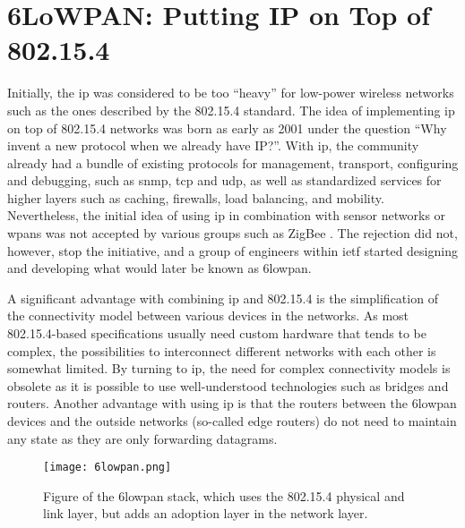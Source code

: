 \section{6LoWPAN: Putting IP on Top of 802.15.4}
\label{sec:6lowpan}


Initially, the \gls{ip} was considered to be too ``heavy'' for low-power wireless networks such as the ones described by the 802.15.4 standard. The idea of implementing \gls{ip} on top of 802.15.4 networks was born as early as 2001 under the question ``Why invent a new protocol when we already have IP?''\cite{Mulligan2007}. With \gls{ip}, the community already had a bundle of existing protocols for management, transport, configuring and debugging, such as \gls{snmp}, \gls{tcp} and \gls{udp}, as well as standardized services for higher layers such as caching, firewalls, load balancing, and mobility. Nevertheless, the initial idea of using \gls{ip} in combination with sensor networks or \gls{wpan}s was not accepted by various groups such as ZigBee \cite{Mulligan2007}. The rejection did not, however, stop the initiative, and a group of engineers within \gls{ietf} started designing and developing what would later be known as \gls{6lowpan}.

A significant advantage with combining \gls{ip} and 802.15.4 is the simplification of the connectivity model between various devices in the networks. As most 802.15.4-based specifications usually need custom hardware that tends to be complex, the possibilities to interconnect different networks with each other is somewhat limited. By turning to \gls{ip}, the need for complex connectivity models is obsolete as it is possible to use well-understood technologies such as bridges and routers. Another advantage with using \gls{ip} is that the routers between the \gls{6lowpan} devices and the outside networks (so-called edge routers) do not need to maintain any state as they are only forwarding datagrams.

\begin{figure}[h]
	\centering
	\texttt{[image: 6lowpan.png]}
	\caption{Figure of the \gls{6lowpan} stack, which uses the 802.15.4 physical and link layer, but adds an adoption layer in the network layer.}
	\label{fig:6lowpan-stack}
\end{figure}

